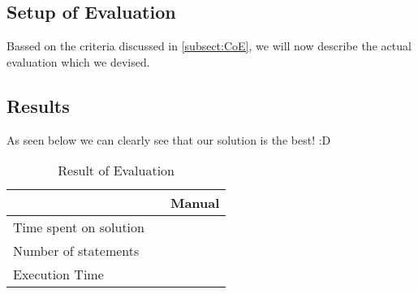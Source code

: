 \subsection{Setup of Evaluation}
Bassed on the criteria discussed in \cref{subsect:CoE}, we will now describe the actual evaluation which we devised. 



\subsection{Results}
As seen below we can clearly see that our solution is the best! :D


\begin{table}[h]
\centering
\caption{Result of Evaluation}
\label{table:result}
\begin{tabular}{|p{}|p{}|p{}|}
\hline
                       & \FW{}	 & Manual				  \\ \hline
Time spent on solution &         &                \\ \hline
Number of statements   &         &                \\ \hline
Execution Time         &         &                \\ \hline
\end{tabular}
\end{table}








